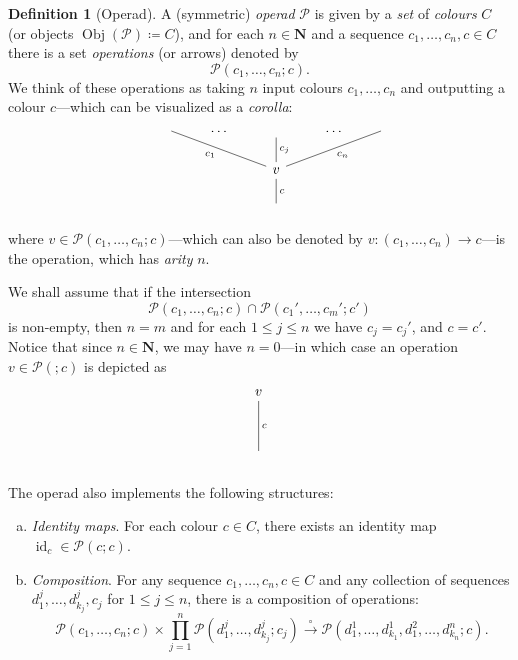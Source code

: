 \documentclass[11pt, reqno]{amsart}
\theoremstyle{definition}
\newtheorem{definition}[theorem]{Definition}
\renewcommand{\leq}{\leqslant}
\newcommand{\N}{\mathbf{N}}
\DeclareMathOperator{\Obj}{Obj}   %
\DeclareMathOperator{\Id}{id}     %
\newcommand{\operad}{\mathcal}
\begin{document}
\begin{definition}[Operad]
\label{def:operad}
A (symmetric) \emph{operad} \(\operad P\) is given by a \emph{set} of
\emph{colours} \(C\) (or objects \(\Obj(\operad P) \coloneq C\)), and for each
\(n \in \N\) and a sequence \(c_1, \dots, c_n, c \in C\) there is a set
\emph{operations} (or arrows) denoted by
\[
\operad P(c_1, \ldots, c_n; c).
\]
We think of these operations as taking \(n\) input colours \(c_1, \dots, c_n\)
and outputting a colour \(c\)---which can be visualized as a \emph{corolla}:
\[
    \begin{tikzcd}
        &\ar[drr, no head, "c_1"'] 
        &\dots 
        &\ar[d, no head, "c_j"] 
        &\dots 
        &\ar[dll, no head, "c_n"]
        \\
        & & &v \ar[d, no head, "c"] & &
        \\
        & & &\phantom{v} & &
    \end{tikzcd}
\]
where \(v \in \operad P(c_1, \ldots, c_n; c)\)---which can also be denoted by
\(v: (c_1, \ldots, c_n) \to c\)---is the operation, which has \emph{arity}
\(n\).

We shall assume that if the intersection 
\[
    \operad P(c_1, \dots, c_n; c) \cap \operad P(c_1', \dots, c_m'; c')
\]
is non-empty, then \(n = m\) and for each \(1 \leq j \leq n\) we have \(c_j =
c_j'\), and \(c = c'\). Notice that since \(n \in \N\), we may have \(n = 0\)---in which case an operation \(v \in \operad P(; c)\) is depicted as
\[
    \begin{tikzcd}
        v \ar[dd, "c", no head] \\ \\
        \phantom{v}
    \end{tikzcd}
\]

The operad also implements the following structures:
\begin{enumerate}[(a)]\setlength\itemsep{0em}
    \item \emph{Identity maps}. For each colour \(c \in C\), there exists an
    identity map \(\Id_c \in \operad P(c; c)\).

    \item \emph{Composition}. For any sequence \(c_1, \dots, c_n, c \in C\) and
    any collection of sequences \(d_1^j, \dots, d_{k_j}^j, c_j\) for \(1
    \leq j \leq n\), there is a composition of operations:
    \[
    \operad P(c_1, \dots, c_n; c)
    \times \prod_{j=1}^n \operad P(d_1^j, \dots, d_{k_j}^j; c_j)
    \overset{\circ}\longrightarrow
    \operad P(d_1^1, \dots, d_{k_1}^1, d_1^2, \dots, d_{k_n}^n; c).
    \]


\end{enumerate}
\end{definition}
\end{document}
